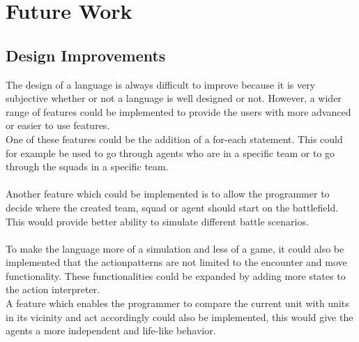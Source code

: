 \section{Future Work}
\subsection{Design Improvements}
The design of a language is always difficult to improve because it is very subjective whether or not a language is well designed or not. However, a wider range of features could be implemented to provide the users with more advanced or easier to use features.\\
\indent One of these features could be the addition of a for-each statement. This could for example be used to go through agents who are in a specific team or to go through the squads in a specific team.\\
\\
Another feature which could be implemented is to allow the programmer to decide where the created team, squad or agent should start on the battlefield. This would provide better ability to simulate different battle scenarios.\\
 \\
To make the language more of a simulation and less of a game, it could also be implemented that the actionpatterns are not limited to the encounter and move functionality. These functionalities could be expanded by adding more states to the action interpreter. \\
A feature which enables the programmer to compare the current unit with units in its vicinity and act accordingly could also be implemented, this would give the agents a more independent and life-like behavior.

